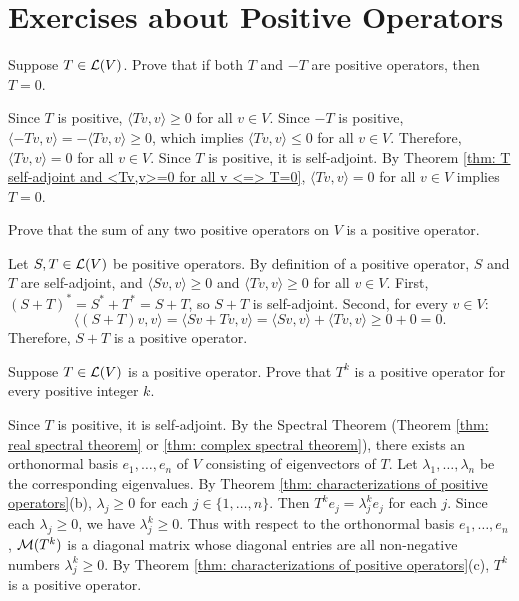 \section*{Exercises about Positive Operators}

\begin{xrcs}
  Suppose $T \in \mathcal{L}(V)$. Prove that if both $T$ and $-T$ are positive operators, then $T = 0$.

\begin{xprf}
  Since $T$ is positive, $\langle Tv, v \rangle \geq 0$ for all $v \in V$.
  Since $-T$ is positive, $\langle -Tv, v \rangle = -\langle Tv, v \rangle \geq 0$, which implies $\langle Tv, v \rangle \leq 0$ for all $v \in V$.
  Therefore, $\langle Tv, v \rangle = 0$ for all $v \in V$.
  Since $T$ is positive, it is self-adjoint.
  By Theorem \ref{thm: T self-adjoint and <Tv,v>=0 for all v <=> T=0}, $\langle Tv, v \rangle = 0$ for all $v \in V$ implies $T = 0$.
\end{xprf}
\end{xrcs}

\begin{xrcs}
  Prove that the sum of any two positive operators on $V$ is a positive operator.

\begin{xprf}
  Let $S, T \in \mathcal{L}(V)$ be positive operators.
  By definition of a positive operator, $S$ and $T$ are self-adjoint, and $\langle Sv, v \rangle \geq 0$ and $\langle Tv, v \rangle \geq 0$ for all $v \in V$.
  First, $(S+T)^* = S^* + T^* = S + T$, so $S+T$ is self-adjoint.
  Second, for every $v \in V$:
  \[
    \langle (S+T)v, v \rangle = \langle Sv + Tv, v \rangle = \langle Sv, v \rangle + \langle Tv, v \rangle \geq 0 + 0 = 0.
  \]
  Therefore, $S+T$ is a positive operator.
\end{xprf}
\end{xrcs}

\begin{xrcs}
  Suppose $T \in \mathcal{L}(V)$ is a positive operator. Prove that $T^k$ is a positive operator for every positive integer $k$.

\begin{xprf}
  Since $T$ is positive, it is self-adjoint.
  By the Spectral Theorem (Theorem \ref{thm: real spectral theorem} or \ref{thm: complex spectral theorem}), there exists an orthonormal basis $e_1, \dots, e_n$ of $V$ consisting of eigenvectors of $T$.
  Let $\lambda_1, \dots, \lambda_n$ be the corresponding eigenvalues.
  By Theorem \ref{thm: characterizations of positive operators}(b), $\lambda_j \geq 0$ for each $j \in \{1, \dots, n\}$.
  Then $T^k e_j = \lambda_j^k e_j$ for each $j$.
  Since each $\lambda_j \geq 0$, we have $\lambda_j^k \geq 0$.
  Thus with respect to the orthonormal basis $e_1, \dots, e_n$, $\mathcal{M}(T^k)$ is a diagonal matrix whose diagonal entries are all non-negative numbers $\lambda_j^k \geq 0$.
  By Theorem \ref{thm: characterizations of positive operators}(c), $T^k$ is a positive operator.
\end{xprf}
\end{xrcs}

